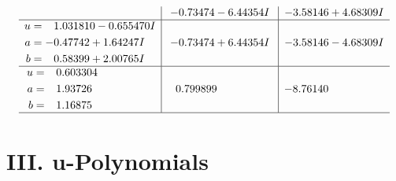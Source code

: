 \documentclass[1p]{elsarticle_modified}
\theoremstyle{definition}
\begin{document}
$$\begin{array}{c|c|c}
 & -0.73474 - 6.44354 I & -3.58146 + 4.68309 I \\ \hline\begin{aligned}
u &= \phantom{-}1.031810 - 0.655470 I \\
a &= -0.47742 + 1.64247 I \\
b &= \phantom{-}0.58399 + 2.00765 I\end{aligned}
 & -0.73474 + 6.44354 I & -3.58146 - 4.68309 I \\ \hline\begin{aligned}
u &= \phantom{-}0.603304\phantom{ +0.000000I} \\
a &= \phantom{-}1.93726\phantom{ +0.000000I} \\
b &= \phantom{-}1.16875\phantom{ +0.000000I}\end{aligned}
 & \phantom{-}0.799899\phantom{ +0.000000I} & -8.76140\phantom{ +0.000000I}\\
 \hline 
 \end{array}$$\newpage
\newpage\renewcommand{\arraystretch}{1}
\centering \section*{ III. u-Polynomials}
\end{document}
